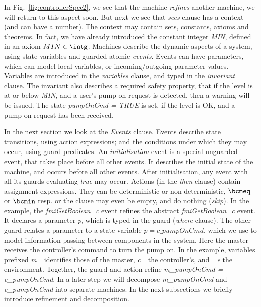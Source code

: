\documentclass{llncs}%
\begin{document}
 In Fig.~\ref{fig:controllerSpec2}, we see that the machine \emph{refines} another machine, we will return to this aspect soon. But next we see that  \emph{sees} clause has a context (and can have a number). The context may contain sets, constants, axioms and theorems. In fact, we have already introduced the constant integer \emph{MIN}, defined in an axiom $MIN \in \intg$. Machines describe the dynamic aspects of a system, using state variables and guarded atomic \emph{events}. Events can have parameters, which can model local variables, or incoming/outgoing parameter values. Variables are introduced in the \emph{variables} clause, and typed in the \emph{invariant} clause. The invariant also describes a required safety property, that if the level is at or below \emph{MIN}, and a user's pump-on request is detected, then a warning will be issued. The state \emph{pumpOnCmd = TRUE} is set, if the level is OK, and a pump-on request has been received.

In the next section we look at the \emph{Events} clause. Events describe state transitions, using action expressions; and the conditions under which they may occur, using guard predicates. An \emph{initialisation} event is a special unguarded event, that takes place before all other events. It describes the initial state of the machine, and occurs before all other events. After initialisation, any event with all its guards evaluating \emph{true} may occur. Actions (in the \emph{then} clause) contain assignment expressions. They can be deterministic or non-deterministic, $\bcmeq$ or $\bcmin$ resp. or the clause may even be empty, and do nothing (\emph{skip}). In the example, the \emph{fmiGetBoolean\_c} event refines the abstract \emph{fmiGetBoolean\_c} event. It declares a parameter \emph{p}, which is typed in the guard (\emph{where} clause). The other guard relates a parameter to a state variable $p = c\_pumpOnCmd$, which we use to model information passing between components in the system. Here the master receives the controller’s command to turn the pump on. In the example, variables prefixed \emph{m\_} identifies those of the master, \emph{c\_} the controller's, and \emph{\_e} the environment. Together, the guard and action refine \emph{m\_pumpOnCmd = c\_pumpOnCmd}. In a later step we will decompose \emph{m\_pumpOnCmd} and \emph{c\_pumpOnCmd} into separate machines. In the next subsections we briefly introduce refinement and decomposition.
\end{document}
